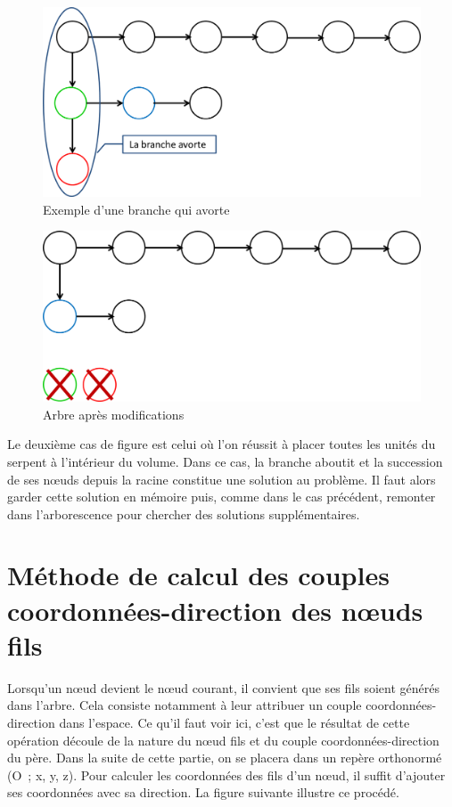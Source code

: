 \begin{figure}[h]
 \centering
 \includegraphics[scale=0.3,keepaspectratio=true]{img/pathAbort.png}
 \caption{Exemple d'une branche qui avorte}
 \label{pathAbort}
\end{figure}

\newpage

\begin{figure}[h]
 \centering
 \includegraphics[scale=0.3,keepaspectratio=true]{img/pathAfter.png}
 \caption{Arbre après modifications}
 \label{pathAfter}
\end{figure}

Le deuxième cas de figure est celui où l’on réussit à placer toutes les unités du serpent à l’intérieur du volume. Dans ce cas, la branche aboutit et la succession de ses nœuds depuis la racine constitue une solution au problème. Il faut alors garder cette solution en mémoire puis, comme dans le cas précédent, remonter dans l’arborescence pour chercher des solutions supplémentaires. 

\section{Méthode de calcul des couples coordonnées-direction des nœuds fils}
Lorsqu’un nœud devient le nœud courant, il convient que ses fils soient générés dans l’arbre. Cela consiste notamment à leur attribuer un couple coordonnées-direction dans l’espace. Ce qu’il faut voir ici, c’est que le résultat de cette opération découle de la nature du nœud fils et du couple coordonnées-direction du père. Dans la suite de cette partie, on se placera dans un repère orthonormé (O ; x, y, z). 
Pour calculer les coordonnées des fils d’un nœud, il suffit d’ajouter ses coordonnées avec sa direction. La figure suivante illustre ce procédé. 

